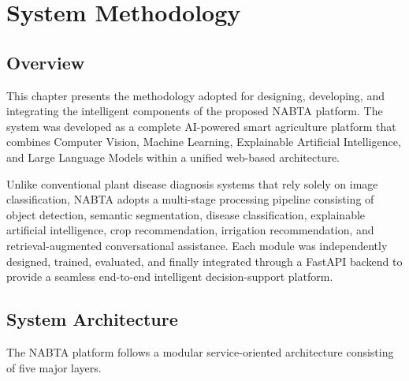 
\chapter{System Methodology}
\label{chap:methodology}


\section{Overview}
\label{sec:methodology_overview}

This chapter presents the methodology adopted for designing, developing, and integrating the intelligent components of the proposed NABTA platform. The system was developed as a complete AI-powered smart agriculture platform that combines Computer Vision, Machine Learning, Explainable Artificial Intelligence, and Large Language Models within a unified web-based architecture.

Unlike conventional plant disease diagnosis systems that rely solely on image classification, NABTA adopts a multi-stage processing pipeline consisting of object detection, semantic segmentation, disease classification, explainable artificial intelligence, crop recommendation, irrigation recommendation, and retrieval-augmented conversational assistance. Each module was independently designed, trained, evaluated, and finally integrated through a FastAPI backend to provide a seamless end-to-end intelligent decision-support platform.

\section{System Architecture}
\label{sec:system_architecture}

The NABTA platform follows a modular service-oriented architecture consisting of five major layers.

